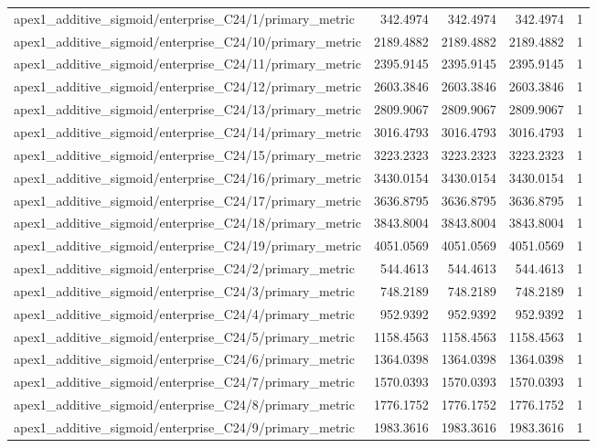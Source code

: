 \begin{table}[h]
\begin{tabular}{lrrrr}
apex1_additive_sigmoid/enterprise_C24/1/primary_metric & 342.4974 & 342.4974 & 342.4974 & 1 \\
apex1_additive_sigmoid/enterprise_C24/10/primary_metric & 2189.4882 & 2189.4882 & 2189.4882 & 1 \\
apex1_additive_sigmoid/enterprise_C24/11/primary_metric & 2395.9145 & 2395.9145 & 2395.9145 & 1 \\
apex1_additive_sigmoid/enterprise_C24/12/primary_metric & 2603.3846 & 2603.3846 & 2603.3846 & 1 \\
apex1_additive_sigmoid/enterprise_C24/13/primary_metric & 2809.9067 & 2809.9067 & 2809.9067 & 1 \\
apex1_additive_sigmoid/enterprise_C24/14/primary_metric & 3016.4793 & 3016.4793 & 3016.4793 & 1 \\
apex1_additive_sigmoid/enterprise_C24/15/primary_metric & 3223.2323 & 3223.2323 & 3223.2323 & 1 \\
apex1_additive_sigmoid/enterprise_C24/16/primary_metric & 3430.0154 & 3430.0154 & 3430.0154 & 1 \\
apex1_additive_sigmoid/enterprise_C24/17/primary_metric & 3636.8795 & 3636.8795 & 3636.8795 & 1 \\
apex1_additive_sigmoid/enterprise_C24/18/primary_metric & 3843.8004 & 3843.8004 & 3843.8004 & 1 \\
apex1_additive_sigmoid/enterprise_C24/19/primary_metric & 4051.0569 & 4051.0569 & 4051.0569 & 1 \\
apex1_additive_sigmoid/enterprise_C24/2/primary_metric & 544.4613 & 544.4613 & 544.4613 & 1 \\
apex1_additive_sigmoid/enterprise_C24/3/primary_metric & 748.2189 & 748.2189 & 748.2189 & 1 \\
apex1_additive_sigmoid/enterprise_C24/4/primary_metric & 952.9392 & 952.9392 & 952.9392 & 1 \\
apex1_additive_sigmoid/enterprise_C24/5/primary_metric & 1158.4563 & 1158.4563 & 1158.4563 & 1 \\
apex1_additive_sigmoid/enterprise_C24/6/primary_metric & 1364.0398 & 1364.0398 & 1364.0398 & 1 \\
apex1_additive_sigmoid/enterprise_C24/7/primary_metric & 1570.0393 & 1570.0393 & 1570.0393 & 1 \\
apex1_additive_sigmoid/enterprise_C24/8/primary_metric & 1776.1752 & 1776.1752 & 1776.1752 & 1 \\
apex1_additive_sigmoid/enterprise_C24/9/primary_metric & 1983.3616 & 1983.3616 & 1983.3616 & 1 \\

\end{tabular}
\end{table}
